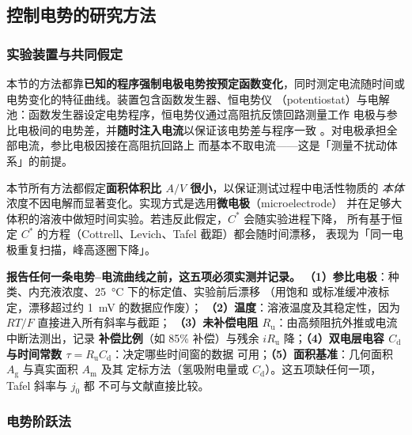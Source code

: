 \subsection{控制电势的研究方法}

\subsubsection{实验装置与共同假定}

本节的方法都靠\textbf{已知的程序强制电极电势按预定函数变化}，同时测定电流随时间或
电势变化的特征曲线。装置包含函数发生器、恒电势仪
（potentiostat）与电解池：函数发生器设定电势程序，恒电势仪通过高阻抗反馈回路测量工作
电极与参比电极间的电势差，并\textbf{随时注入电流}以保证该电势差与程序一致
。对电极承担全部电流，参比电极因接在高阻抗回路上
而基本不取电流——这是「测量不扰动体系」的前提。

\begin{keycond}
本节所有方法都假定\textbf{面积体积比 $A/V$ 很小}，以保证测试过程中电活性物质的
\emph{本体}浓度不因电解而显著变化。实现方式是选用\textbf{微电极}（microelectrode）
并在足够大体积的溶液中做短时间实验。若违反此假定，$C^*$ 会随实验进程下降，
所有基于恒定 $C^*$ 的方程（Cottrell、Levich、Tafel 截距）都会随时间漂移，
表现为「同一电极重复扫描，峰高逐圈下降」。
\end{keycond}

\begin{measure}
\textbf{报告任何一条电势--电流曲线之前，这五项必须实测并记录。}
\textbf{（1）参比电极}：种类、内充液浓度、\qty{25}{\celsius} 下的标定值、实验前后漂移
（用饱和  或标准缓冲液标定，漂移超过约 \qty{1}{mV} 的数据应作废）；
\textbf{（2）温度}：溶液温度及其稳定性，因为 $RT/F$ 直接进入所有斜率与截距；
\textbf{（3）未补偿电阻 $R_{\mathrm{u}}$}：由高频阻抗外推或电流中断法测出，记录
\textbf{补偿比例}（如 85\% 补偿）与残余 $iR_{\mathrm{u}}$ 降；\textbf{（4）双电层电容
$C_{\mathrm{d}}$ 与时间常数 $\tau=R_{\mathrm{u}}C_{\mathrm{d}}$}：决定哪些时间窗的数据
可用；\textbf{（5）面积基准}：几何面积 $A_{\mathrm{g}}$ 与真实面积 $A_{\mathrm{m}}$ 及其
定标方法（氢吸附电量或 $C_{\mathrm{d}}$）。这五项缺任何一项，Tafel 斜率与 $j_0$ 都
不可与文献直接比较。
\end{measure}

\subsubsection{电势阶跃法}

